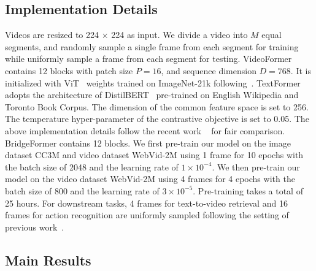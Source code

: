 \documentclass[10pt,twocolumn,letterpaper]{article}
\begin{document}
\subsection{Implementation Details}
Videos are resized to 224 $\times$ 224 as input. We divide a video into $M$ equal segments, and randomly sample a single frame from each segment for training while uniformly sample a frame from each segment for testing. VideoFormer contains 12 blocks with patch size $P=16$, and sequence dimension $D=768$. It is initialized with ViT~\cite{vit} weights trained on ImageNet-21k following~\cite{frozen}. TextFormer adopts the architecture of DistilBERT~\cite{distilbert} pre-trained on English Wikipedia and Toronto Book Corpus.  The dimension of the common feature space is set to 256. The temperature hyper-parameter of the contrastive objective is set to 0.05. The above implementation details follow the recent work ~\cite{frozen} for fair comparison. BridgeFormer contains 12 blocks. We first pre-train our model on the image dataset CC3M and video dataset WebVid-2M using 1 frame for 10 epochs with the batch size of 2048 and the learning rate of $1\times {10}^{-4}$. We then pre-train our model on the video dataset WebVid-2M using 4 frames for 4 epochs with the batch size of 800 and the learning rate of $3\times {10}^{-5}$. Pre-training takes a total of 25 hours. For downstream tasks, 4 frames for text-to-video retrieval and 16 frames for action recognition are uniformly sampled following the setting of previous work~\cite{frozen, MIL-NCE}.



\subsection{Main Results}
\end{document}
